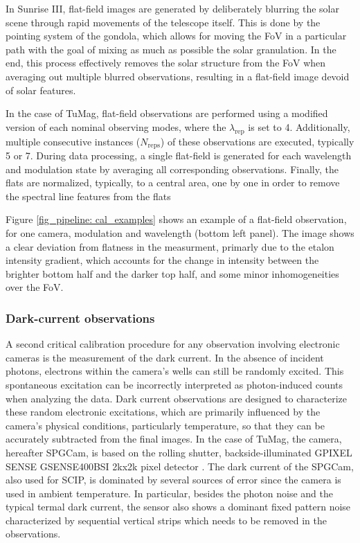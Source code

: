 In Sunrise III, flat-field images are generated by deliberately blurring the solar scene through rapid movements of the telescope itself. This is done by the pointing system of the gondola, which allows for moving the FoV in a particular path with the goal of mixing as much as possible the solar granulation. In the end, this process effectively removes the solar structure from the FoV when averaging out multiple blurred observations, resulting in a flat-field image devoid of solar features.

In the case of TuMag, flat-field observations are performed using a modified version of each nominal observing modes, where the $\lambda_{\text{rep}}$ is set to 4. Additionally, multiple consecutive instances ($N_{\text{reps}}$) of these observations are executed, typically 5 or 7. During data processing, a single flat-field is generated for each wavelength and modulation state by averaging all corresponding observations. Finally, the flats are normalized, typically, to a central area, one by one in order to remove the spectral line features from the flats

Figure \ref{fig_pipeline: cal_examples} shows an example of a flat-field observation, for one camera, modulation and wavelength (bottom left panel). The image shows a clear deviation from flatness in the measurment, primarly due to the etalon intensity gradient, which accounts for the change in intensity between the brighter bottom half and the darker top half, and some minor inhomogeneities over the FoV. 

\subsubsection{Dark-current observations}

A second critical calibration procedure for any observation involving electronic cameras is the measurement of the dark current. In the absence of incident photons, electrons within the camera's wells can still be randomly excited. This spontaneous excitation can be incorrectly interpreted as photon-induced counts when analyzing the data. Dark current observations are designed to characterize these random electronic excitations, which are primarily influenced by the camera's physical conditions, particularly temperature, so that they can be accurately subtracted from the final images. In the case of TuMag, the camera, hereafter SPGCam,  is based on the rolling shutter, backside-illuminated GPIXEL SENSE GSENSE400BSI 2kx2k pixel detector \citep{tumag-cams}. The dark current of the SPGCam, also used for SCIP, is dominated by several sources of error since the camera is used in ambient temperature. In particular, besides the photon noise and the typical termal dark current, the sensor also shows a dominant fixed pattern noise characterized by sequential vertical strips which needs to be removed in the observations.  

